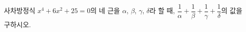 사차방정식 $x^4+6x^2+25=0$의 네 근을 $\alpha$, $\beta$, $\gamma$, $\delta$라 할 때, $\dfrac{1}{\alpha}+\dfrac{1}{\beta}+\dfrac{1}{\gamma}+\dfrac{1}{\delta}$의 값을 구하시오.
